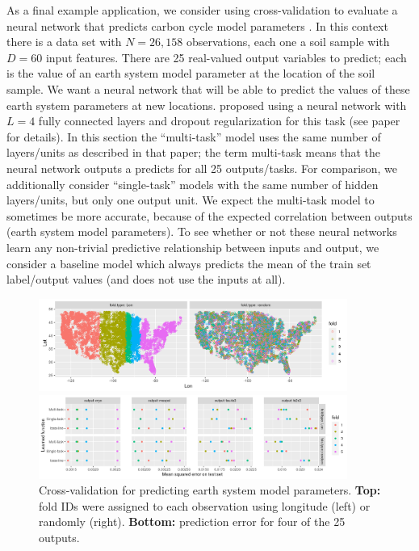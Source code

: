 \documentclass[12pt]{article}
\begin{document}
As a final example application, we consider using cross-validation to
evaluate a neural network that predicts carbon cycle model parameters
\citep{Feng2020}. In this context there is a data set with $N=26,158$
observations, each one a soil sample with $D=60$ input features.
There are 25 real-valued output variables to predict; each is the
value of an earth system model parameter at the location of the soil
sample. We want a neural network that will be able to predict the
values of these earth system parameters at new
locations. \citet{Feng2020} proposed using a neural network with $L=4$
fully connected layers and dropout regularization for this task (see
paper for details). In this section the ``multi-task'' model uses the
same number of layers/units as described in that paper; the term
multi-task means that the neural network outputs a predicts for all 25
outputs/tasks. For comparison, we additionally consider
``single-task'' models with the same number of hidden layers/units,
but only one output unit. We expect the multi-task model to sometimes
be more accurate, because of the expected correlation between outputs
(earth system model parameters). To see whether or not these neural
networks learn any non-trivial predictive relationship between inputs
and output, we consider a baseline model which always predicts the
mean of the train set label/output values (and does not use the inputs
at all).

\begin{figure}
  \centering
  \includegraphics[width=0.9\textwidth]{figure-proda-cv-data-map}

  \includegraphics[width=0.9\textwidth]{figure-proda-cv-some-out}
    
  \caption{Cross-validation for predicting earth system model
    parameters. \textbf{Top:} fold IDs were assigned to each
    observation using longitude (left) or randomly
    (right). \textbf{Bottom:} prediction error for four of the 25
    outputs.}
  \label{fig:proda-cv}
\end{figure}
\end{document}
